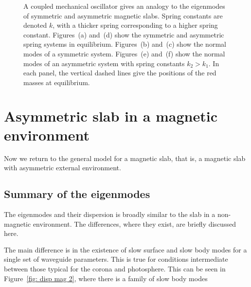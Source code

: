 \documentclass[12pt,draft]{../style-files/ociamthesis}
\begin{document}
\begin{figure}
{{{
			\label{fig: springs asym anti-phase}}}}

	\caption{A coupled mechanical oscillator gives an analogy to the eigenmodes of symmetric and asymmetric magnetic slabs. Spring constants are denoted $k$, with a thicker spring corresponding to a higher spring constant. Figures~(a) and~(d) show the symmetric and asymmetric spring systems in equilibrium. Figures~(b) and~(c) show the normal modes of a symmetric system. Figures~(e) and~(f) show the normal modes of an asymmetric system with spring constants $k_2 > k_1$. In each panel, the vertical dashed lines give the positions of the red masses at equilibrium.}
	\label{fig: springs all}
\end{figure}


\section{Asymmetric slab in a magnetic environment}
\label{sec: EVP mag}

Now we return to the general model for a magnetic slab, that is, a magnetic slab with asymmetric external environment.

\subsection{Summary of the eigenmodes}

The eigenmodes and their dispersion is broadly similar to the slab in a non-magnetic environment. The differences, where they exist, are briefly discussed here.

The main difference is in the existence of slow surface and slow body modes for a single set of waveguide parameters. This is true for conditions intermediate between those typical for the corona and photosphere. This can be seen in Figure~\ref{fig: disp mag 2}, where there is a family of slow body modes 
\end{document}
